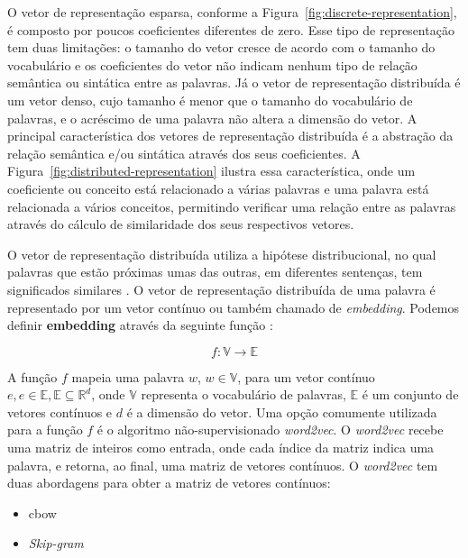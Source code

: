 O vetor de representação esparsa, conforme a Figura~\ref{fig:discrete-representation}, é composto por poucos coeficientes diferentes de zero. Esse tipo de representação tem duas limitações: o tamanho do vetor cresce de acordo com o tamanho do vocabulário e os coeficientes do vetor não indicam nenhum tipo de relação semântica ou sintática entre as palavras. Já o vetor de representação distribuída é um vetor denso, cujo tamanho é menor que o tamanho do vocabulário de palavras, e o acréscimo de uma palavra não altera a dimensão do vetor. A principal característica dos vetores de representação distribuída é a abstração da relação semântica e/ou sintática através dos seus coeficientes. A Figura~\ref{fig:distributed-representation} ilustra essa característica, onde um coeficiente ou conceito está relacionado a várias palavras e uma palavra está relacionada a vários conceitos, permitindo verificar uma relação entre as palavras através do cálculo de similaridade dos seus respectivos vetores.

 O vetor de representação distribuída utiliza a hipótese distribucional, no qual palavras que estão próximas umas das outras, em diferentes sentenças, tem significados similares \citep{Goodfellow-et-al-2016}. O vetor de representação distribuída de uma palavra é representado por um vetor contínuo ou também chamado de \textit{embedding}. Podemos definir \textbf{embedding} através da seguinte função \citep{cambronero-deep-learning-code-search:2019}:

\begin{equation}
    f: \mathbb{V} \rightarrow \mathbb{E}
\end{equation}

A função $f$ mapeia uma palavra $w$, $w \in \mathbb{V}$, para um vetor contínuo $e, e \in \mathbb{E}, \mathbb{E }\subseteq \mathbb{R}^{d}$, onde $\mathbb{V}$ representa o vocabulário de palavras, $\mathbb{E}$ é um conjunto de vetores contínuos e $d$ é a dimensão do vetor. Uma opção comumente utilizada para a função $f$ é o algoritmo não-supervisionado \textit{word2vec}. O \textit{word2vec} recebe uma matriz de inteiros como entrada, onde cada índice da matriz indica uma palavra, e retorna, ao final, uma matriz de vetores contínuos. O \textit{word2vec} tem duas abordagens para obter a matriz de vetores contínuos:

\begin{itemize}
    \item \acrfull{cbow}
    \item \textit{Skip-gram}
\end{itemize}
 
